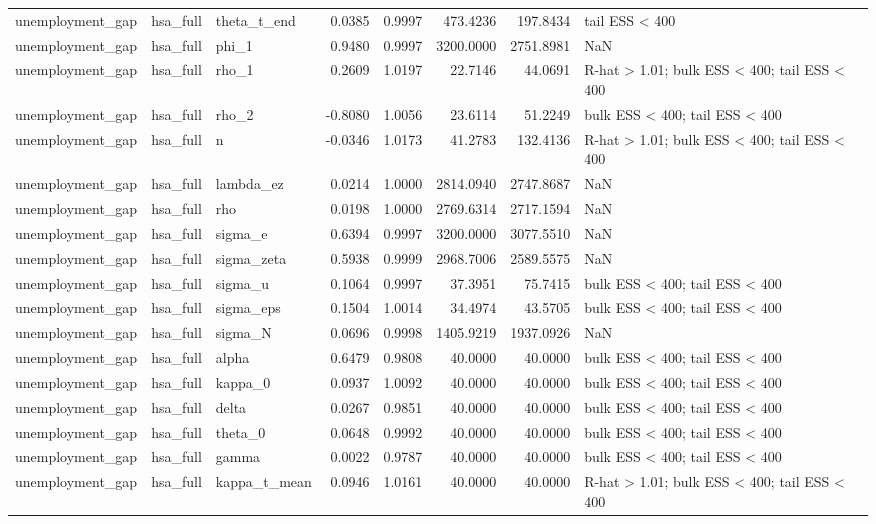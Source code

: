 \begin{tabular}{lllrrrrl}
unemployment\_gap & hsa\_full & theta\_t\_end & 0.0385 & 0.9997 & 473.4236 & 197.8434 & tail ESS < 400 \\
unemployment\_gap & hsa\_full & phi\_1 & 0.9480 & 0.9997 & 3200.0000 & 2751.8981 & NaN \\
unemployment\_gap & hsa\_full & rho\_1 & 0.2609 & 1.0197 & 22.7146 & 44.0691 & R-hat > 1.01; bulk ESS < 400; tail ESS < 400 \\
unemployment\_gap & hsa\_full & rho\_2 & -0.8080 & 1.0056 & 23.6114 & 51.2249 & bulk ESS < 400; tail ESS < 400 \\
unemployment\_gap & hsa\_full & n & -0.0346 & 1.0173 & 41.2783 & 132.4136 & R-hat > 1.01; bulk ESS < 400; tail ESS < 400 \\
unemployment\_gap & hsa\_full & lambda\_ez & 0.0214 & 1.0000 & 2814.0940 & 2747.8687 & NaN \\
unemployment\_gap & hsa\_full & rho & 0.0198 & 1.0000 & 2769.6314 & 2717.1594 & NaN \\
unemployment\_gap & hsa\_full & sigma\_e & 0.6394 & 0.9997 & 3200.0000 & 3077.5510 & NaN \\
unemployment\_gap & hsa\_full & sigma\_zeta & 0.5938 & 0.9999 & 2968.7006 & 2589.5575 & NaN \\
unemployment\_gap & hsa\_full & sigma\_u & 0.1064 & 0.9997 & 37.3951 & 75.7415 & bulk ESS < 400; tail ESS < 400 \\
unemployment\_gap & hsa\_full & sigma\_eps & 0.1504 & 1.0014 & 34.4974 & 43.5705 & bulk ESS < 400; tail ESS < 400 \\
unemployment\_gap & hsa\_full & sigma\_N & 0.0696 & 0.9998 & 1405.9219 & 1937.0926 & NaN \\
unemployment\_gap & hsa\_full & alpha & 0.6479 & 0.9808 & 40.0000 & 40.0000 & bulk ESS < 400; tail ESS < 400 \\
unemployment\_gap & hsa\_full & kappa\_0 & 0.0937 & 1.0092 & 40.0000 & 40.0000 & bulk ESS < 400; tail ESS < 400 \\
unemployment\_gap & hsa\_full & delta & 0.0267 & 0.9851 & 40.0000 & 40.0000 & bulk ESS < 400; tail ESS < 400 \\
unemployment\_gap & hsa\_full & theta\_0 & 0.0648 & 0.9992 & 40.0000 & 40.0000 & bulk ESS < 400; tail ESS < 400 \\
unemployment\_gap & hsa\_full & gamma & 0.0022 & 0.9787 & 40.0000 & 40.0000 & bulk ESS < 400; tail ESS < 400 \\
unemployment\_gap & hsa\_full & kappa\_t\_mean & 0.0946 & 1.0161 & 40.0000 & 40.0000 & R-hat > 1.01; bulk ESS < 400; tail ESS < 400 \\

\end{tabular}
